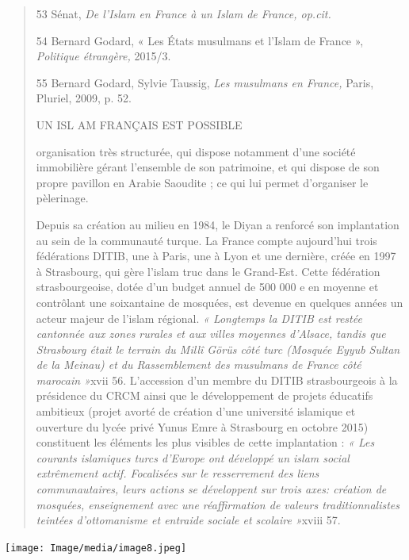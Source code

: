 \begin{quote}
53 Sénat, \emph{De l'Islam en France à un Islam de France, op.cit.}

54 Bernard Godard, « Les États musulmans et l'Islam de France »,
\emph{Politique étrangère,} 2015/3.

55 Bernard Godard, Sylvie Taussig, \emph{Les musulmans en France,}
Paris, Pluriel, 2009, p. 52.

UN ISL AM FRANÇAIS EST POSSIBLE

organisation très structurée, qui dispose notamment d'une société
immobilière gérant l'ensemble de son patrimoine, et qui dispose de son
propre pavillon en Arabie Saoudite ; ce qui lui permet d'organiser le
pèlerinage.

Depuis sa création au milieu en 1984, le Diyan a renforcé son
implantation au sein de la communauté turque. La France compte
aujourd'hui trois fédérations DITIB, une à Paris, une à Lyon et une
dernière, créée en 1997 à Strasbourg, qui gère l'islam truc dans le
Grand-Est. Cette fédération strasbourgeoise, dotée d'un budget annuel de
500 000 e en moyenne et contrôlant une soixantaine de mosquées, est
devenue en quelques années un acteur majeur de l'islam régional. \emph{«
Longtemps la DITIB est restée cantonnée aux zones rurales et aux villes
moyennes d'Alsace, tandis que Strasbourg était le terrain du Millî Görüs
côté turc (Mosquée Eyyub Sultan de la Meinau) et du Rassemblement des
musulmans de France côté marocain »}xvii 56. L'accession d'un membre du
DITIB strasbourgeois à la présidence du CRCM ainsi que le développement
de projets éducatifs ambitieux (projet avorté de création d'une
université islamique et ouverture du lycée privé Yunus Emre à Strasbourg
en octobre 2015) constituent les éléments les plus visibles de cette
implantation : \emph{« Les courants islamiques turcs d'Europe ont
développé un islam social extrêmement actif. Focalisées sur le
resserrement des liens communautaires, leurs actions se développent sur
trois axes: création de mosquées, enseignement avec une réaffirmation de
valeurs traditionnalistes teintées d'ottomanisme et entraide sociale et
scolaire »}xviii 57.
\end{quote}

\texttt{[image: Image/media/image8.jpeg]}

